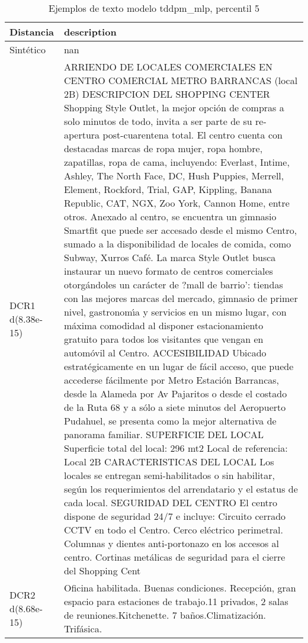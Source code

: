 \begin{table}[H]
\centering
\fontsize{10}{14}\selectfont
\caption{Ejemplos de texto modelo tddpm\_mlp, percentil 5}
\label{table-example-economicos-b-2-tddpm_mlp-5p-text}
\begin{tabular}{|l|m{35em}|}
\hline
\rowcolor[gray]{0.8}
Distancia & description \\
\hline Sintético & nan \\
\hline DCR1 d(8.38e-15) & ARRIENDO DE LOCALES COMERCIALES EN CENTRO COMERCIAL METRO BARRANCAS (local 2B)  DESCRIPCION DEL SHOPPING CENTER Shopping Style Outlet, la mejor opci\'on de compras a solo minutos de todo, invita a ser parte de su re-apertura post-cuarentena total.  El centro cuenta con destacadas marcas de ropa mujer, ropa hombre, zapatillas, ropa de cama, incluyendo: Everlast, Intime, Ashley, The North Face, DC, Hush Puppies, Merrell, Element, Rockford, Trial, GAP, Kippling, Banana Republic, CAT, NGX, Zoo York, Cannon Home, entre otros.   Anexado al centro, se encuentra un gimnasio Smartfit que puede ser accesado desde el mismo Centro, sumado a la disponibilidad de locales de comida, como Subway, Xurros Caf\'e.  La marca Style Outlet busca instaurar un nuevo formato de centros comerciales otorg\'andoles un car\'acter de ?mall de barrio': tiendas con las mejores marcas del mercado, gimnasio de primer nivel, gastronom{\'\i}a y servicios en un mismo lugar, con m\'axima comodidad al disponer estacionamiento gratuito para todos los visitantes que vengan en autom\'ovil al Centro.  ACCESIBILIDAD Ubicado estrat\'egicamente en un lugar de f\'acil acceso, que puede accederse f\'acilmente por Metro Estaci\'on Barrancas, desde la Alameda por Av Pajaritos o desde el costado de la Ruta 68 y a s\'olo a siete minutos del Aeropuerto Pudahuel, se presenta como la mejor alternativa de panorama familiar.  SUPERFICIE DEL LOCAL Superficie total del local: 296 mt2 Local de referencia: Local 2B  CARACTERISTICAS DEL LOCAL Los locales se entregan semi-habilitados o sin habilitar, seg\'un los requerimientos del arrendatario y el estatus de cada local.  SEGURIDAD DEL CENTRO El centro dispone de seguridad 24/7 e incluye: Circuito cerrado CCTV en todo el Centro. Cerco el\'ectrico perimetral. Columnas y dientes anti-portonazo en los accesos al centro. Cortinas met\'alicas de seguridad para el cierre del Shopping Cent \\
\hline DCR2 d(8.68e-15) & Oficina habilitada. Buenas condiciones. Recepci\'on, gran espacio para estaciones de trabajo.11 privados, 2 salas de reuniones.Kitchenette. 7 ba\~nos.Climatizaci\'on.  Trif\'asica. \\
\hline
\end{tabular}
\end{table}
